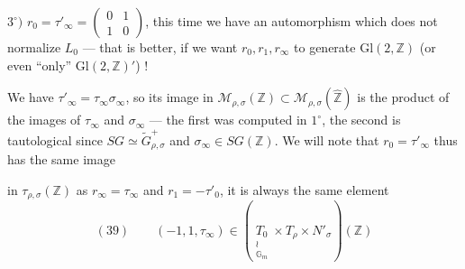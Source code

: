 $3^\circ)$ $r_0=\tau'_\infty=\begin{pmatrix}0&1\\1&0\end{pmatrix}$, this time we have an automorphism  which does not normalize $L_0$ --- that is better, if we want $r_0,r_1,r_\infty$ to generate $\mathrm{Gl}(2,\mathbb Z)$ (or even ``only'' $\mathrm{Gl}(2,\mathbb Z)'$) !

We have $\tau'_\infty=\tau_\infty\sigma_\infty$, so its image in $\mathcal M_{\rho,\sigma}(\mathbb Z)\subset\mathcal M_{\rho,\sigma}(\widehat{\mathbb Z})$ is  the product of the images of $\tau_\infty$ and $\sigma_\infty$ --- the first was computed in $1^\circ$, the second is tautological since $SG\simeq\widetilde G_{\rho,\sigma}^{+}$ and $\sigma_\infty\in SG(\mathbb Z)$. We will note that  $r_0=\tau'_\infty$ thus has the same image


in $\tau_{\rho,\sigma}(\mathbb Z)$ as $r_\infty=\tau_\infty$ and $r_1=-\tau'_0$, it is always the same element 
\[
(39)\qquad (-1,1,\tau_\infty)\in
\left(\underset{\substack{\wr\\\mathbb G_m}}{T_0}\times T_\rho\times N'_\sigma\right)(\mathbb Z)
\]

